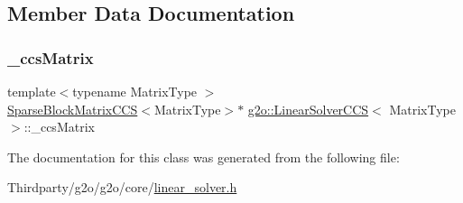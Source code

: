 \subsection{Member Data Documentation}
\mbox{\label{classg2o_1_1_linear_solver_c_c_s_a07f0df9a6012d567e26a89063c53aa12}} 
\subsubsection{\texorpdfstring{\+\_\+ccs\+Matrix}{\_ccsMatrix}}
{\footnotesize\ttfamily template$<$typename Matrix\+Type $>$ \\
\mbox{\hyperlink{classg2o_1_1_sparse_block_matrix_c_c_s}{Sparse\+Block\+Matrix\+C\+CS}}$<$Matrix\+Type$>$$\ast$ \mbox{\hyperlink{classg2o_1_1_linear_solver_c_c_s}{g2o\+::\+Linear\+Solver\+C\+CS}}$<$ Matrix\+Type $>$\+::\+\_\+ccs\+Matrix\hspace{0.3cm}{\ttfamily [protected]}}



The documentation for this class was generated from the following file\+:\begin{DoxyCompactItemize}
\item 
Thirdparty/g2o/g2o/core/\mbox{\hyperlink{linear__solver_8h}{linear\+\_\+solver.\+h}}\end{DoxyCompactItemize}
